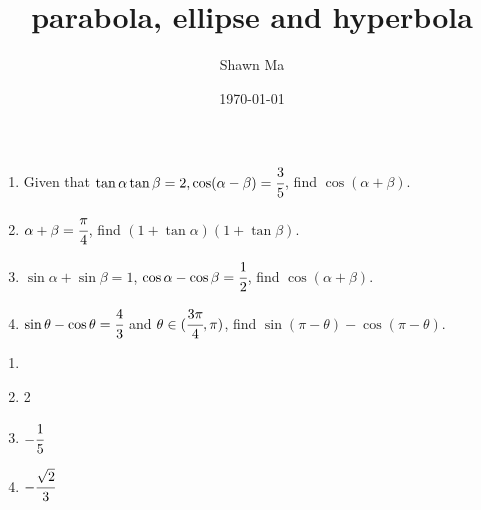 \documentclass[letterpaper,12pt]{article}
\author{Shawn Ma}
\date{\today}
\title{parabola, ellipse and hyperbola}
\begin{document}
\setlength{\parindent}{0pt}

\begin{enumerate}
\item Given that $\tan\alpha\tan\beta=2, \cos(\alpha-\beta)=\cfrac{3}{5}$, find $\cos(\alpha+\beta)$.
\vspace{3cm}
\item $\alpha+\beta=\cfrac{\pi}{4}$, find $(1+\tan\alpha)(1+\tan\beta)$.\vspace{3cm}
\item $\sin\alpha+\sin\beta=1$, $\cos\alpha-\cos\beta=\cfrac{1}{2}$, find $\cos(\alpha+\beta)$.\vspace{3cm}
\item $\sin\theta-\cos\theta=\cfrac{4}{3}$ and $\theta\in(\cfrac{3\pi}{4},\pi)$, find $\sin(\pi-\theta)-\cos(\pi-\theta)$.\vspace{3cm}
\end{enumerate}
\pagebreak
\begin{enumerate}
    \item 
    \item 2
    \item $-\cfrac{1}{5}$
    \item $-\cfrac{\sqrt{2}}{3}$
\end{enumerate}
\end{document}
